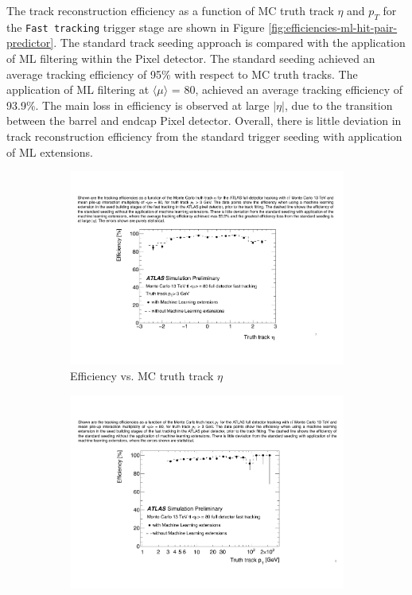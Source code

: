 The track reconstruction efficiency as a function of MC truth track $\eta$ and $p_T$ for the \texttt{Fast tracking} trigger stage are shown in Figure \ref{fig:efficiencies-ml-hit-pair-predictor}. The standard track seeding approach is compared with the application of ML filtering within the Pixel detector. The standard seeding achieved an average tracking efficiency of 95\% with respect to MC truth tracks. The application of ML filtering at $\langle \mu \rangle$ = 80, achieved an average tracking efficiency of 93.9\%. The main loss in efficiency is observed at large $\lvert \eta \rvert$, due to the transition between the barrel and endcap Pixel detector. Overall, there is little deviation in track reconstruction efficiency from the standard trigger seeding with application of ML extensions.


\begin{figure}[!htbp]
\centering
    \begin{subfigure}[a]{0.86\textwidth}
        \includegraphics[width=\linewidth]{images/4-ml-based-predictor/efficiency_eta.pdf}
        \caption{Efficiency vs. MC truth track $\eta$}
    \label{fig:efficiencies-ml-hit-pair-predictor-eta}
    \end{subfigure}
    \hfill
    \begin{subfigure}[b]{0.86\textwidth}
        \centering
        \includegraphics[width=\linewidth]{images/4-ml-based-predictor/efficiency_pT.pdf}

\end{subfigure}
\end{figure}
